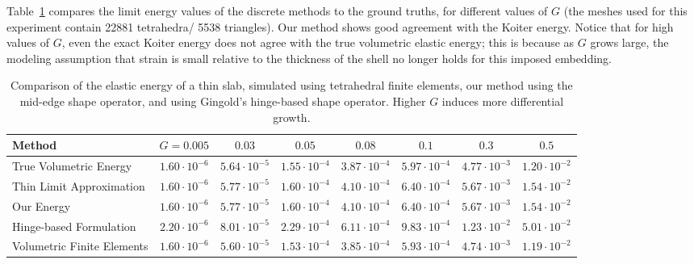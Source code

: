 \documentclass[timestamp,acmtog]{acmart}
\begin{document}
Table~\ref{tab:energy} compares the limit energy values of the discrete methods to the ground truths, for different values of $G$ (the meshes used for this experiment contain 22881 tetrahedra/ 5538 triangles).  Our method shows good agreement with the Koiter energy. Notice that for high values of $G$, even the exact Koiter energy does not agree with the true volumetric elastic energy; this is because as $G$ grows large, the modeling assumption that strain is small relative to the thickness of the shell no longer holds for this imposed embedding.
\begin{table}
\begin{tabular}{l|ccccccc}
Method & $G=0.005$ & $0.03$ & $0.05$ & $0.08$ & $0.1$ & $0.3$ & $0.5$  \\
\hline
True Volumetric Energy & $1.60\cdot 10^{-6}$ & $5.64 \cdot 10^{-5}$ & $1.55 \cdot 10^{-4}$ & $3.87 \cdot 10^{-4}$ & $5.97 \cdot 10^{-4}$ & $4.77 \cdot 10^{-3}$ & $1.20 \cdot 10^{-2}$ \\
Thin Limit Approximation & $1.60\cdot 10^{-6}$ & $5.77\cdot 10^{-5}$  &  $1.60\cdot10^{-4}$ & $4.10\cdot 10^{-4}$ & $6.40 \cdot 10^{-4}$ & $5.67 \cdot 10^{-3}$ & $1.54\cdot 10^{-2}$\\
\hline
Our Energy & $1.60 \cdot 10^{-6}$ & $5.77 \cdot 10^{-5}$ & $1.60 \cdot 10^{-4}$ & $4.10 \cdot 10^{-4}$ & $6.40 \cdot 10^{-4}$ & $5.67 \cdot 10^{-3}$ & $1.54 \cdot 10^{-2}$ \\
Hinge-based Formulation & $2.20 \cdot 10^{-6}$ & $8.01 \cdot 10^{-5}$ & $2.29 \cdot 10^{-4}$ & $6.11 \cdot 10^{-4}$ & $9.83 \cdot 10^{-4}$ & $1.23 \cdot 10^{-2}$ & $5.01 \cdot 10^{-2}$ \\
Volumetric Finite Elements & $1.60 \cdot 10^{-6}$ & $5.60 \cdot 10^{-5}$ & $1.53 \cdot 10^{-4}$ & $3.85 \cdot 10^{-4}$ & $5.93 \cdot 10^{-4}$ & $4.74 \cdot 10^{-3}$ & $1.19 \cdot 10^{-2}$
\end{tabular} 
\caption{Comparison of the elastic energy of a thin slab, simulated using tetrahedral finite elements, our method using the mid-edge shape operator, and using Gingold's hinge-based shape operator. Higher $G$ induces more differential growth.}
\label{tab:energy}
\end{table}
\end{document}
